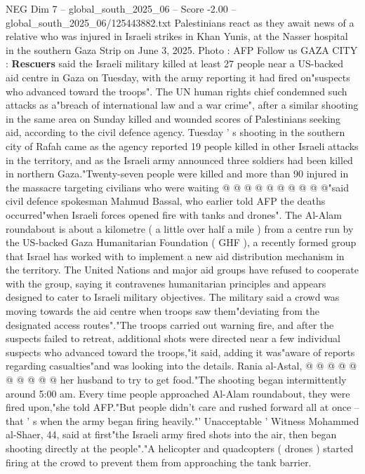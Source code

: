 \begin{textsample}{NEG Dim 7 – global\_south\_2025\_06 – Score -2.00 – global\_south\_2025\_06/125443882.txt}  \label{ex:f7_neg_054}
Palestinians react as they await news of a relative who was injured in Israeli strikes in Khan Yunis, at the Nasser hospital in the southern Gaza Strip on June 3, 2025.
Photo : AFP Follow us GAZA CITY : \textbf{Rescuers} said the Israeli military killed at least 27 people near a US-backed aid centre in Gaza on Tuesday, with the army reporting it had fired on"suspects who advanced toward the troops".
The UN human rights chief condemned such attacks as a"breach of international law and a war crime", after a similar shooting in the same area on Sunday killed and wounded scores of Palestinians seeking aid, according to the civil defence agency.
Tuesday ' s shooting in the southern city of Rafah came as the agency reported 19 people killed in other Israeli attacks in the territory, and as the Israeli army announced three soldiers had been killed in northern Gaza."Twenty-seven people were killed and more than 90 injured in the massacre targeting civilians who were waiting @ @ @ @ @ @ @ @ @ @"said civil defence spokesman Mahmud Bassal, who earlier told AFP the deaths occurred"when Israeli forces opened fire with tanks and drones".
The Al-Alam roundabout is about a kilometre ( a little over half a mile ) from a centre run by the US-backed Gaza Humanitarian Foundation ( GHF ), a recently formed group that Israel has worked with to implement a new aid distribution mechanism in the territory.
The United Nations and major aid groups have refused to cooperate with the group, saying it contravenes humanitarian principles and appears designed to cater to Israeli military objectives.
The military said a crowd was moving towards the aid centre when troops saw them"deviating from the designated access routes"."The troops carried out warning fire, and after the suspects failed to retreat, additional shots were directed near a few individual suspects who advanced toward the troops,"it said, adding it was"aware of reports regarding casualties"and was looking into the details.
Rania al-Astal, @ @ @ @ @ @ @ @ @ @ her husband to try to get food."The shooting began intermittently around 5:00 am.
Every time people approached Al-Alam roundabout, they were fired upon,"she told AFP."But people didn't care and rushed forward all at once -- that ' s when the army began firing heavily."' Unacceptable ' Witness Mohammed al-Shaer, 44, said at first"the Israeli army fired shots into the air, then began shooting directly at the people"."A helicopter and quadcopters ( drones ) started firing at the crowd to prevent them from approaching the tank barrier.

\end{textsample}
